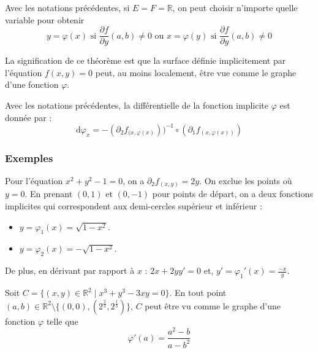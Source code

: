 
	\begin{remark}
		Avec les notations précédentes, si $E = F = \mathbb{R}$, on peut choisir n'importe quelle variable pour obtenir
		\[ y = \varphi(x) \text{ si } \frac{\partial f}{\partial y}(a,b) \neq 0 \text{ ou } x = \varphi(y) \text{ si } \frac{\partial f}{\partial y}(a,b) \neq 0 \]
	\end{remark}


	\begin{remark}
		La signification de ce théorème est que la surface définie implicitement par l'équation $f(x,y)=0$ peut, au moins localement, être vue comme le graphe d'une fonction $\varphi$.
	\end{remark}

	\begin{proposition}
		Avec les notations précédentes, la différentielle de la fonction implicite $\varphi$ est donnée par :
		\[ \mathrm{d}\varphi_x = -(\partial_2 f_{(x, \varphi(x)}))^{-1} \circ (\partial_1 f_{(x, \varphi(x))}) \]
	\end{proposition}

	\subsubsection{Exemples}

	\begin{example}
		Pour l'équation $x^2 + y^2 - 1 = 0$, on a $\partial_2 f_{(x,y)} = 2y$. On exclue les points où $y = 0$. En prenant $(0,1)$ et $(0,-1)$ pour points de départ, on a deux fonctions implicites qui correspondent aux demi-cercles supérieur et inférieur :
		\begin{itemize}
			\item $y = \varphi_1(x) = \sqrt{1-x^2}$.
			\item $y = \varphi_2(x) = -\sqrt{1-x^2}$.
		\end{itemize}
		De plus, en dérivant par rapport à $x$ : $2x + 2yy' = 0$ et, $y' = \varphi_1'(x) = \frac{-x}{y}$.
	\end{example}


	\begin{example}
		Soit $C = \{ (x,y) \in \mathbb{R}^2 \mid x^3 + y^3 - 3xy = 0 \}$. En tout point $(a,b) \in \mathbb{R}^2 \setminus \{ (0,0), (2^{\frac{2}{3}}, 2^{\frac{1}{3}}) \}$, $C$ peut être vu comme le graphe d'une fonction $\varphi$ telle que
		\[ \varphi'(a) = \frac{a^2-b}{a-b^2} \]
	\end{example}

